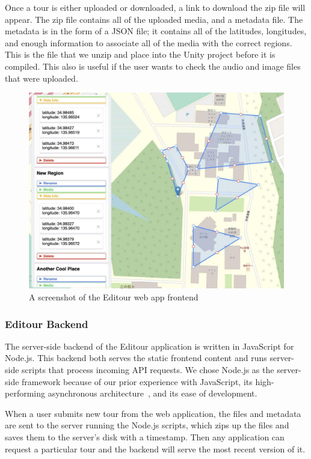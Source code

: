 \documentclass[a4paper, 10pt, american, titlepage]{article}
\begin{document}
Once a tour is either uploaded or downloaded, a link to download the zip file
will appear. The zip file contains all of the uploaded media, and a metadata
file. The metadata is in the form of a JSON file; it contains all of the
latitudes, longitudes, and enough information to associate all of the media
with the correct regions. This is the file that we unzip and place into the
Unity project before it is compiled. This also is useful if the user wants to
check the audio and image files that were uploaded.

\begin{figure}[h]
	\centering
	\includegraphics[width=\textwidth]{editour.jpg}
	\caption{A screenshot of the Editour web app frontend}
	\label{fig:editour}
\end{figure}

\subsubsection{Editour Backend}
\label{sec:editourBackend}

The server-side backend of the Editour application is written in JavaScript for
Node.js. This backend both serves the static frontend content and runs
server-side scripts that process incoming API requests.  We chose Node.js as the
server-side framework because of our prior experience with JavaScript, its
high-performing asynchronous architecture~\autocite{orsini2013}, and its ease of
development.

When a user submits new tour from the web application, the files and metadata
are sent to the server running the Node.js scripts, which zips up the files and
saves them to the server's disk with a timestamp. Then any application can
request a particular tour and the backend will serve the most recent version of
it.
\end{document}

